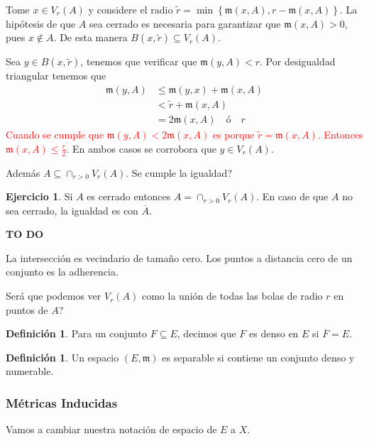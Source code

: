 \documentclass[12pt]{article}
\theoremstyle{plain}
\theoremstyle{definition}
\newtheorem{Def}[Th]{Definición}       %
\newtheorem{Ej}[Th]{Ejercicio}
\theoremstyle{remark}
\numberwithin{equation}{section}
\newcommand{\mm}{\mathfrak{m}}      %
\renewcommand{\leq}{\leqslant}      %
\renewcommand{\:}{\colon}           %
\newcommand{\conj}[1]{\left\lbrace#1\right\rbrace}
\begin{document}
\begin{multicols}{2}
\begin{ptcb}
Tome $x\in V_r(A)$ y considere el radio $\tilde{r}=\min\conj{\mm(x,A),r-\mm(x,A)}$. La hipótesis de que $A$ sea cerrado es necesaria para garantizar que $\mm(x,A)>0$, pues $x\not\in A$. De esta manera $B(x,\tilde{r})\subseteq V_r(A)$. \par
Sea $y\in B(x,\tilde{r})$, tenemos que verificar que $\mm(y,A)<r$. Por desigualdad triangular tenemos que
\begin{align*}
 \mm(y,A)&\leq\mm(y,x)+\mm(x,A)\\
 &<\tilde{r}+\mm(x,A) \\
 &=2\mm(x,A)\quad\text{ó}\quad r
\end{align*}
 \textcolor{red}{Cuando se cumple que $\mm(y,A)<2\mm(x,A)$ es porque $\tilde{r}=\mm(x,A)$. Entonces $\mm(x,A)\leq\frac{r}{2}$}. En ambos casos se corrobora que $y\in V_r(A)$.
\end{ptcb}

Además $A\subseteq\cap_{r>0}V_r(A)$. Se cumple la igualdad?
\begin{Ej}
  Si $A$ es cerrado entonces $A=\cap_{r>0}V_r(A)$. En caso de que $A$ no sea cerrado, la igualdad es con $\overline{A}$.
\end{Ej}

\begin{ptcb}
\textbf{TO DO}\par
La intersección es vecindario de tamaño cero. Los puntos a distancia cero de un conjunto es la adherencia.\par
Será que podemos ver $V_r(A)$ como la unión de todas las bolas de radio $r$ en puntos de $A$?
\end{ptcb}

\begin{Def}
  Para un conjunto $F\subseteq E$, decimos que $F$ es denso en $E$ si $\overline{F}=E$.
\end{Def}

\begin{Def}
  Un espacio $(E,\mm)$ es separable si contiene un conjunto denso y numerable.
\end{Def}

\subsubsection*{Métricas Inducidas}

Vamos a cambiar nuestra notación de espacio de $E$ a $X$.


\end{multicols}
\end{document}

